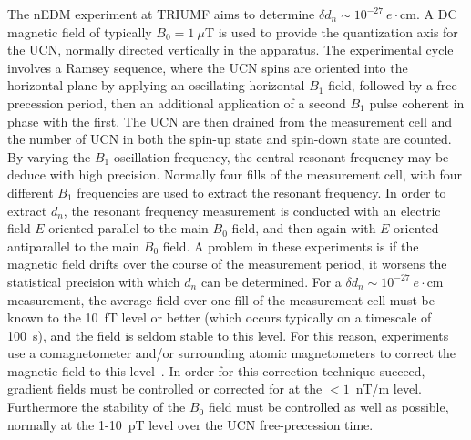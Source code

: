 \documentclass[review]{elsarticle}
\begin{document}
The nEDM experiment at TRIUMF aims to determine $\delta d_n\sim
10^{-27}~e\cdot$cm. A DC magnetic field of typically $B_0=1~\mu$T is
used to provide the quantization axis for the UCN, normally directed
vertically in the apparatus.  The experimental cycle involves a Ramsey
sequence, where the UCN spins are oriented into the horizontal plane
by applying an oscillating horizontal $B_1$ field, followed by a free
precession period, then an additional application of a second $B_1$
pulse coherent in phase with the first.  The UCN are then drained from
the measurement cell and the number of UCN in both the spin-up state
and spin-down state are counted.  By varying the $B_1$ oscillation
frequency, the central resonant frequency may be deduce with high
precision.  Normally four fills of the measurement cell, with four
different $B_1$ frequencies are used to extract the resonant
frequency.  In order to extract $d_n$, the resonant frequency
measurement is conducted with an electric field $E$ oriented parallel
to the main $B_0$ field, and then again with $E$ oriented antiparallel
to the main $B_0$ field.  A problem in these experiments is if the
magnetic field drifts over the course of the measurement period, it
worsens the statistical precision with which $d_n$ can be determined.
For a $\delta d_n\sim 10^{-27}~e\cdot$cm measurement, the average
field over one fill of the measurement cell must be known to the 10~fT
level or better (which occurs typically on a timescale of 100~s), and
the field is seldom stable to this level.  For this reason,
experiments use a comagnetometer and/or surrounding atomic
magnetometers to correct the magnetic field to this
level~\cite{something,somethingelse,somethingelse2}.  In order for
this correction technique succeed, gradient fields must be controlled
or corrected for at the $<1$~nT/m level.  Furthermore the stability of
the $B_0$ field must be controlled as well as possible, normally at
the 1-10~pT level over the UCN free-precession time.

\end{document}
